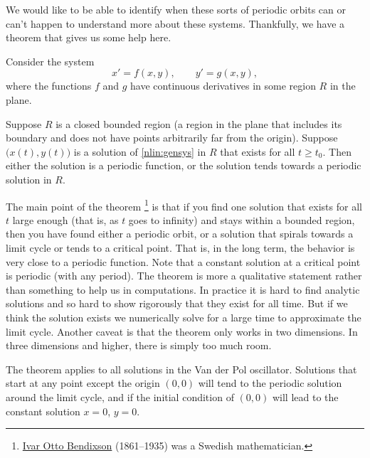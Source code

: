 \documentclass{ximera}
\begin{document}
We would like to be able to identify when these sorts of periodic orbits can or can't happen to understand more about these systems. Thankfully, we have a theorem that gives us some help here. 


\begin{theorem}
     Consider the system
    \begin{equation} \label{nlin:gensys}
        x' = f(x,y), \qquad y' = g(x,y) ,
    \end{equation}
    where the functions $f$ and $g$ have continuous derivatives in some region $R$ in the plane. 
    
    Suppose $R$ is a closed bounded region (a region in the plane that includes its boundary and does not have points arbitrarily far from the origin). Suppose $\bigl(x(t), y(t)\bigr)$ is a solution of \eqref{nlin:gensys} in $R$ that exists for all $t \geq t_0$.  Then either the solution is a periodic function, or the solution tends towards a periodic solution in $R$. 
\end{theorem}

The main point of the theorem%
\footnote{%
    \href{https://en.wikipedia.org/wiki/Ivar_Otto_Bendixson}{Ivar Otto Bendixson} (1861--1935) was a Swedish mathematician.
}%
is that if you find one solution that exists for all $t$ large enough (that is, as $t$ goes to infinity) and stays within a bounded region, then you have found either a periodic orbit, or a solution that spirals towards a limit cycle or tends to a critical point. That is, in the long term, the behavior is very close to a periodic function. Note that a constant solution at a critical point is periodic (with any period). The theorem is more a qualitative statement rather than something to help us in computations. In practice it is hard to find analytic solutions and so hard to show rigorously that they exist for all time. But if we think the solution exists we numerically solve for a large time to approximate the limit cycle. Another caveat is that the theorem only works in two dimensions.  In three dimensions and higher, there is simply too much room.

The theorem applies to all solutions in the Van der Pol oscillator. Solutions that start at any point except the origin $(0,0)$ will tend to the periodic solution around the limit cycle, and if the initial condition of $(0,0)$ will lead to the constant solution $x=0$, $y=0$.
\end{document}

